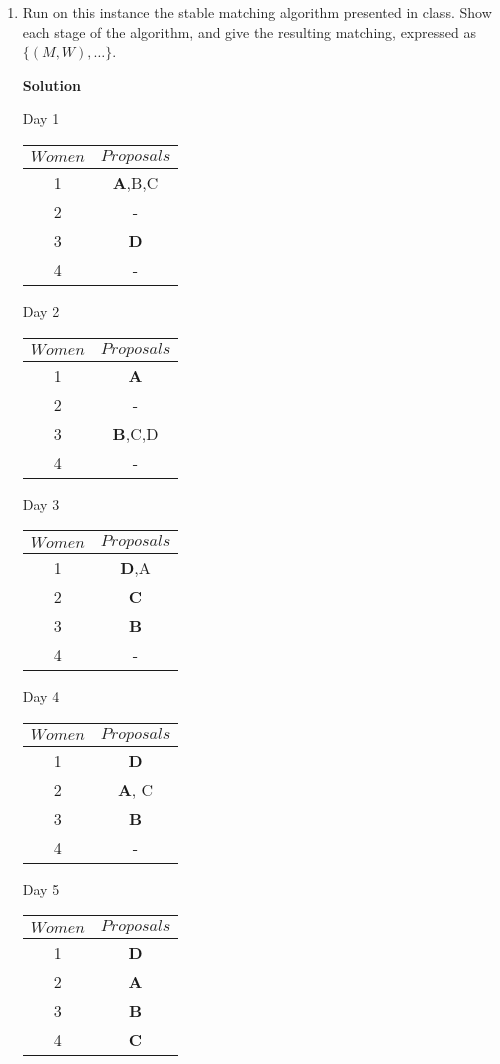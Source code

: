 \documentclass[11pt]{article}
\newenvironment{Parts}{\begin{enumerate}[label=(\alph*)]}{\end{enumerate}}
\newcommand*{\Part}{\item}
\newenvironment{Answer}{\vspace{10pt}\begin{mdframed}\textbf{Solution}\\}{\end{mdframed}\vfill\pagebreak[3]}
\newenvironment{Answer}{\vspace{10pt}}{\vfill\pagebreak[3]}
\begin{document}
\begin{Parts}
\Part  Run on this instance the stable matching algorithm presented in class. Show each stage of the algorithm, and give the resulting matching, expressed as $\{(M,W),\ldots\}$.

\begin{Answer}
\begin{center}
Day 1
\begin{tabular}{ c | c  }
$Women$ & $Proposals$\\
\hline
1 & \textbf{A},B,C \\
2 & - \\
3 & \textbf{D} \\
4 & - \\

\end{tabular}
Day 2
\begin{tabular}{ c | c  }
$Women$ & $Proposals$\\
\hline
1 & \textbf{A} \\
2 & - \\
3 & \textbf{B},C,D \\
4 & - \\

\end{tabular}



Day 3
\begin{tabular}{ c | c  }
$Women$ & $Proposals$\\
\hline
1 & \textbf{D},A \\
2 & \textbf{C} \\
3 & \textbf{B} \\
4 & - \\

\end{tabular}
Day 4
\begin{tabular}{ c | c  }
$Women$ & $Proposals$\\
\hline
1 & \textbf{D} \\
2 & \textbf{A}, C \\
3 & \textbf{B} \\
4 & -\\

\end{tabular}

Day 5
\begin{tabular}{ c | c  }
$Women$ & $Proposals$\\
\hline
1 & \textbf{D} \\
2 & \textbf{A} \\
3 & \textbf{B} \\
4 & \textbf{C} \\


\end{tabular}
\end{center}
\end{Answer}
\end{Parts}
\end{document}
